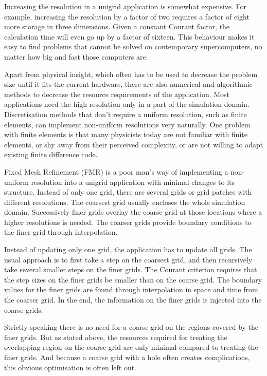 Increasing the resolution in a unigrid application is somewhat
expensive.  For example, increasing the resolution by a factor of two
requires a factor of eight more storage in three dimensions.  Given a
constant Courant factor, the calculation time will even go up by a
factor of sixteen.  This behaviour makes it easy to find problems that
cannot be solved on contemporary supercomputers, no matter how big and
fast those computers are.

Apart from physical insight, which often has to be used to decrease
the problem size until it fits the current hardware, there are also
numerical and algorithmic methods to decrease the resource
requirements of the application.  Most applications need the high
resolution only in a part of the simulation domain.  Discretisation
methods that don't require a uniform resolution, such as finite
elements, can implement non-uniform resolutions very naturally.  One
problem with finite elements is that many physicists today are not
familiar with finite elements, or shy away from their perceived
complexity, or are not willing to adapt existing finite difference
code.

Fixed Mesh Refinement (FMR) is a poor man's way of implementing a
non-uniform resolution into a unigrid application with minimal changes
to its structure.  Instead of only one grid, there are several grids
or grid patches with different resolutions.  The coarsest grid usually
encloses the whole simulation domain.  Successively finer grids
overlay the coarse grid at those locations where a higher resolutions
is needed.  The coarser grids provide boundary conditions to the finer
grid through interpolation.

Instead of updating only one grid, the application has to update all
grids.  The usual approach is to first take a step on the coarsest
grid, and then recursively take several smaller steps on the finer
grids.  The Courant criterion requires that the step sizes on the
finer grids be smaller than on the coarse grid.  The boundary values
for the finer grids are found through interpolation in space and time
from the coarser grid.  In the end, the information on the finer grids
is injected into the coarse grids.

Strictly speaking there is no need for a coarse grid on the regions
covered by the finer grids.  But as stated above, the resources
required for treating the overlapping region on the coarse grid are
only minimal compared to treating the finer grids.  And because a
coarse grid with a hole often creates complications, this obvious
optimisation is often left out.


